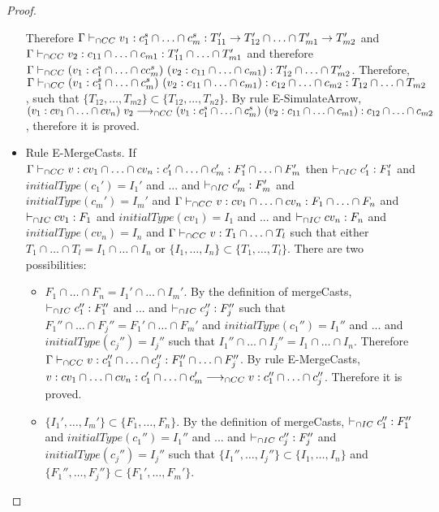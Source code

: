\documentclass[a4paper]{article}
\begin{document}
\begin{proof}
\begin{itemize}
    Therefore $\Gamma \vdash_{\cap CC} v_1 : c^s_1 \cap \ldots \cap c^s_m : T_{11}' \rightarrow T_{12}' \cap \ldots \cap T_{m1}' \rightarrow T_{m2}'$ and $\Gamma \vdash_{\cap CC} v_2 : c_{11} \cap \ldots \cap c_{m1} : T_{11}' \cap \ldots \cap T_{m1}'$ and therefore $\Gamma \vdash_{\cap CC} (v_1 : c^s_1 \cap \ldots \cap c c^s_m)\ (v_2 : c_{11} \cap \ldots \cap c_{m1}) : T_{12}' \cap \ldots \cap T_{m2}'$.
    Therefore, $\Gamma \vdash_{\cap CC} (v_1 : c^s_1 \cap \ldots \cap c^s_m)\ (v_2 : c_{11} \cap \ldots \cap c_{m1}) : c_{12} \cap \ldots \cap c_{m2} : T_{12} \cap \ldots \cap T_{m2}$, such that $\{T_{12}, \ldots, T_{m2}\} \subset \{T_{12}, \ldots, T_{n2}\}$.
    By rule E-SimulateArrow, $(v_1 : cv_1 \cap \ldots \cap cv_n)\ v_2 \gios\\ (v_1 : c^s_1 \cap \ldots \cap c^s_m)\ (v_2 : c_{11} \cap \ldots \cap c_{m1}) : c_{12} \cap \ldots \cap c_{m2}$, therefore it is proved.
    \item Rule E-MergeCasts.
    If $\Gamma \vdash_{\cap CC} v : cv_1 \cap \ldots \cap cv_n : c_1' \cap \ldots \cap c_m' : F_1' \cap \ldots \cap F_m'$ then $\vdash_{\cap IC} c_1' : F_1'$ and $initialType(c_1') = I_1'$ and ... and $\vdash_{\cap IC} c_m' : F_m'$ and $initialType(c_m') = I_m'$ and $\Gamma \vdash_{\cap CC} v : cv_1 \cap \ldots \cap cv_n : F_1 \cap \ldots \cap F_n$ and $\vdash_{\cap IC} cv_1 : F_1$ and $initialType(cv_1) = I_1$ and ... and $\vdash_{\cap IC} cv_n : F_n$ and $initialType(cv_n) = I_n$ and $\Gamma \vdash_{\cap CC} v : T_1 \cap \ldots \cap T_l$ such that either $T_1 \cap \ldots \cap T_l = I_1 \cap \ldots \cap I_n$ or $\{I_1, \ldots, I_n\} \subset \{T_1, \ldots, T_l\}$.
    There are two possibilities:
    \begin{itemize}
        \item $F_1 \cap \ldots \cap F_n = I_1' \cap \ldots \cap I_m'$.
        By the definition of mergeCasts, $\vdash_{\cap IC} c_1'' : F_1''$ and ... and $\vdash_{\cap IC} c_j'' : F_j''$ such that $F_1'' \cap \ldots \cap F_j'' = F_1' \cap \ldots \cap F_m'$ and $initialType(c_1'') = I_1''$ and ... and $initialType(c_j'') = I_j''$ such that $I_1'' \cap \ldots \cap I_j'' = I_1 \cap \ldots \cap I_n$.
        Therefore $\Gamma \vdash_{\cap CC} v : c_1'' \cap \ldots \cap c_j'' : F_1'' \cap \ldots \cap F_j''$.
        By rule E-MergeCasts, $v : cv_1 \cap \ldots \cap cv_n : c_1' \cap \ldots \cap c_m' \longrightarrow_{\cap CC} v : c_1'' \cap \ldots \cap c_j''$.
        Therefore it is proved.
        \item $\{I_1', \ldots, I_m'\} \subset \{F_1, \ldots, F_n\}$.
        By the definition of mergeCasts, $\vdash_{\cap IC} c_1'' : F_1''$ and $initialType(c_1'') = I_1''$ and ... and $\vdash_{\cap IC} c_j'' : F_j''$ and $initialType(c_j'') = I_j''$ such that $\{I_1'', \ldots, I_j''\} \subset \{I_1, \ldots, I_n\}$ and $\{F_1'', \ldots, F_j''\} \subset \{F_1', \ldots, F_m'\}$.

\end{itemize}
\end{itemize}
\end{proof}
\end{document}
